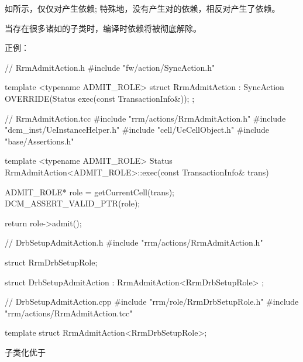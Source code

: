 \begin{content}
如所示，仅仅对产生依赖; 特殊地，没有产生对的依赖，相反对产生了依赖。

当存在很多诸如的子类时，编译时依赖将被彻底解除。

正例：
\begin{leftbar}
\begin{c++}
// RrmAdmitAction.h
#include "fw/action/SyncAction.h"

template <typename ADMIT_ROLE>
struct RrmAdmitAction : SyncAction
{
    OVERRIDE(Status exec(const TransactionInfo&));
};
\end{c++}
\end{leftbar}

\begin{leftbar}
\begin{c++}
// RrmAdmitAction.tcc
#include "rrm/actions/RrmAdmitAction.h"
#include "dcm_inst/UeInstanceHelper.h"
#include "cell/UeCellObject.h"
#include "base/Assertions.h"

template <typename ADMIT_ROLE>
Status RrmAdmitAction<ADMIT_ROLE>::exec(const TransactionInfo& trans)
{
    ADMIT_ROLE* role = getCurrentCell(trans);
    DCM_ASSERT_VALID_PTR(role);

    return role->admit(); 
}
\end{c++}
\end{leftbar}

\begin{leftbar}
\begin{c++}
// DrbSetupAdmitAction.h 
#include "rrm/actions/RrmAdmitAction.h"

struct RrmDrbSetupRole;

struct DrbSetupAdmitAction : RrmAdmitAction<RrmDrbSetupRole> {};
\end{c++}
\end{leftbar}

\begin{leftbar}
\begin{c++}
// DrbSetupAdmitAction.cpp
#include "rrm/role/RrmDrbSetupRole.h"
#include "rrm/actions/RrmAdmitAction.tcc"

template struct RrmAdmitAction<RrmDrbSetupRole>;

\end{c++}
\end{leftbar}

\begin{advise}
子类化优于
\end{advise}


\end{content}

